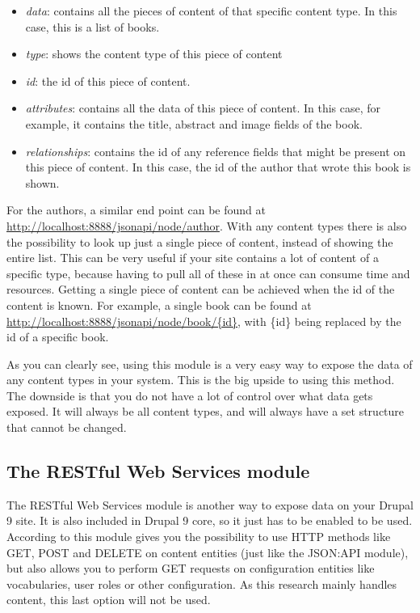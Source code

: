 \begin{itemize}
	\item \emph{data}: contains all the pieces of content of that specific content type. In this case, this is a list of books.
	\item \emph{type}: shows the content type of this piece of content
	\item \emph{id}: the id of this piece of content.
	\item \emph{attributes}: contains all the data of this piece of content. In this case, for example, it contains the title, abstract and image fields of the book.
	\item \emph{relationships}: contains the id of any reference fields that might be present on this piece of content. In this case, the id of the author that wrote this book is shown.
\end{itemize}

For the authors, a similar end point can be found at \url{http://localhost:8888/jsonapi/node/author}. With any content types there is also the possibility to look up just a single piece of content, instead of showing the entire list. This can be very useful if your site contains a lot of content of a specific type, because having to pull all of these in at once can consume time and resources. Getting a single piece of content can be achieved when the id of the content is known. For example, a single book can be found at \url{http://localhost:8888/jsonapi/node/book/{id}}, with \{id\} being replaced by the id of a specific book.

As you can clearly see, using this module is a very easy way to expose the data of any content types in your system. This is the big upside to using this method. The downside is that you do not have a lot of control over what data gets exposed. It will always be all content types, and will always have a set structure that cannot be changed.


\subsection{The  RESTful Web Services module}

The RESTful Web Services module is another way to expose data on your Drupal 9 site. It is also included in Drupal 9 core, so it just has to be enabled to be used. According to \textcite{So2018} this module gives you the possibility to use HTTP methods like GET, POST and DELETE on content entities (just like the JSON:API module), but also allows you to perform GET requests on configuration entities like vocabularies, user roles or other configuration. As this research mainly handles content, this last option will not be used.



